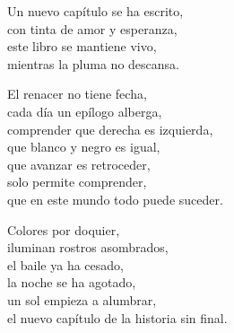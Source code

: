 \begin{center}
\vspace{3em} 
Un nuevo capítulo se ha escrito,\\ 
con tinta de amor y esperanza,\\ 
este libro se mantiene vivo,\\ 
mientras la pluma no descansa.

\vspace{1em} 
El renacer no tiene fecha,\\ 
cada día un epílogo alberga,\\ 
comprender que derecha es izquierda,\\ 
que blanco y negro es igual,\\ 
que avanzar es retroceder,\\ 
solo permite comprender,\\ 
que en este mundo todo puede suceder.

\vspace{1em} 
Colores por doquier,\\ 
iluminan rostros asombrados,\\ 
el baile ya ha cesado,\\ 
la noche se ha agotado,\\ 
un sol empieza a alumbrar,\\ 
el nuevo capítulo de la historia sin final.


\end{center}




